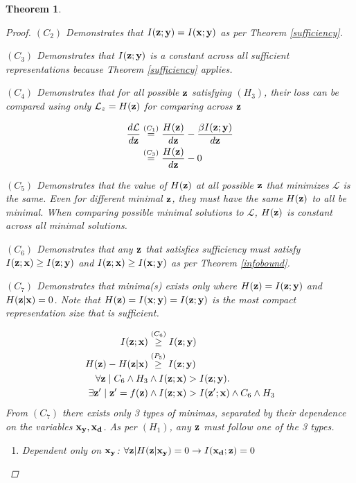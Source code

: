 \documentclass[letterpaper]{article} %
\theoremstyle{plain}
\newtheorem{theorem}{Theorem}[section]
\theoremstyle{definition}
\theoremstyle{remark}
\begin{document}
\begin{theorem}
\begin{proof}
$(C_2)$ Demonstrates that $I({\mathbf{z}}; {\mathbf{y}}) = I({\mathbf{x}}; {\mathbf{y}})$ as per Theorem \ref{sufficiency}. 

$(C_3)$ Demonstrates that $I({\mathbf{z}}; {\mathbf{y}})$ is a constant across all sufficient representations because Theorem \ref{sufficiency} applies.

$(C_4)$ Demonstrates that for all possible ${\mathbf{z}}$ satisfying $(H_3)$, their loss can be compared using only $\mathcal{L}_z = H({\mathbf{z}})$ for comparing across ${\mathbf{z}}$

$$
\begin{aligned}
    \frac{d\mathcal{L}}{d{\mathbf{z}}}  &\stackrel{\left(C_1\right)}{=}\frac{H({\mathbf{z}})}{d{\mathbf{z}}} - \frac{\beta I({\mathbf{z}}; {\mathbf{y}})}{d{\mathbf{z}}} \\
&\stackrel{\left(C_3\right)}{=}\frac{H({\mathbf{z}})}{d{\mathbf{z}}} - 0
\end{aligned}
$$

$(C_5)$ Demonstrates that the value of $H({\mathbf{z}})$ at all possible ${\mathbf{z}}$ that minimizes $\mathcal{L}$ is the same. Even for different minimal ${\mathbf{z}}$, they must have the same $H({\mathbf{z}})$ to all be minimal. When comparing possible minimal solutions to $\mathcal{L}$, $H({\mathbf{z}})$ is constant across all minimal solutions. 

$(C_6)$ Demonstrates that any ${\mathbf{z}}$ that satisfies sufficiency must satisfy $I({\mathbf{z}}; {\mathbf{x}}) \geq I({\mathbf{z}}; {\mathbf{y}})$ and $I({\mathbf{z}}; {\mathbf{x}}) \geq I({\mathbf{x}}; {\mathbf{y}})$ as per Theorem \ref{infobound}. 

$(C_7)$ Demonstrates that minima(s) exists only where $H({\mathbf{z}}) = I({\mathbf{z}}; {\mathbf{y}})$ and $H({\mathbf{z}}| {\mathbf{x}}) = 0$. Note that $H({\mathbf{z}}) = I({\mathbf{x}}; {\mathbf{y}}) = I({\mathbf{z}}; {\mathbf{y}})$ is the most compact representation size that is sufficient. 

$$
\begin{aligned}
    I({\mathbf{z}};{\mathbf{x}}) &\stackrel{\left(C_6\right)}{\geq} I({\mathbf{z}}; {\mathbf{y}}) \\
    H({\mathbf{z}}) - H({\mathbf{z}}| {\mathbf{x}})  &\stackrel{\left(P_5\right)}{\geq} I({\mathbf{z}}; {\mathbf{y}})\\
    \forall {\mathbf{z}}\mid C_6 \land H_3 &\land I({\mathbf{z}}; {\mathbf{x}}) > I({\mathbf{z}}; {\mathbf{y}}) . \\
    \exists {\mathbf{z}}' \mid {\mathbf{z}}' = f({\mathbf{z}}) &\land I({\mathbf{z}}; {\mathbf{x}}) > I({\mathbf{z}}'; {\mathbf{x}}) \land C_6 \land H_3
\end{aligned}
$$
From $(C_7)$ there exists only 3 types of minimas, separated by their dependence on the variables  ${\mathbf{x}}_{\mathbf{y}}, {\mathbf{x}}_{\mathbf{d}}$. As per $(H_1)$, any ${\mathbf{z}}$ must follow one of the 3 types. 

\begin{enumerate}
    \item Dependent only on ${\mathbf{x}}_{\mathbf{y}}$: $\forall {\mathbf{z}}|H({\mathbf{z}}|{\mathbf{x}}_{\mathbf{y}})=0 \rightarrow I({\mathbf{x}}_{\mathbf{d}}; {\mathbf{z}}) = 0$
    

\end{enumerate}
\end{proof}
\end{theorem}
\end{document}
